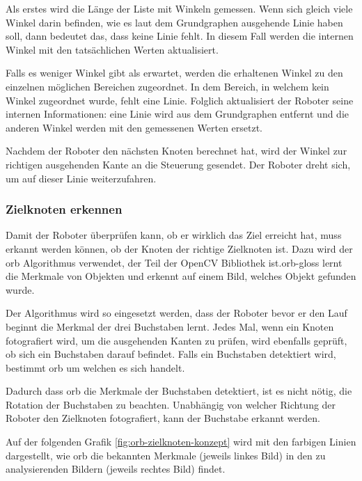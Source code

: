 Als erstes wird die Länge der Liste mit Winkeln gemessen. Wenn sich gleich viele Winkel darin befinden, wie es laut dem Grundgraphen ausgehende Linie haben soll, dann bedeutet das, dass keine Linie fehlt. In diesem Fall werden die internen Winkel mit den tatsächlichen Werten aktualisiert.

Falls es weniger Winkel gibt als erwartet, werden die erhaltenen Winkel zu den einzelnen möglichen Bereichen zugeordnet. In dem Bereich, in welchem kein Winkel zugeordnet wurde, fehlt eine Linie. Folglich aktualisiert der Roboter seine internen Informationen: eine Linie wird aus dem Grundgraphen entfernt und die anderen Winkel werden mit den gemessenen Werten ersetzt.

Nachdem der Roboter den nächsten Knoten berechnet hat, wird der Winkel zur richtigen ausgehenden Kante an die Steuerung gesendet. Der Roboter dreht sich, um auf dieser Linie weiterzufahren.

\subsubsection{Zielknoten erkennen}

Damit der Roboter überprüfen kann, ob er wirklich das Ziel erreicht hat, muss erkannt werden können, ob der Knoten der richtige Zielknoten ist. Dazu wird der \acrfull{orb} Algorithmus verwendet, der Teil der OpenCV Bibliothek ist.\gls{orb-gloss} lernt die Merkmale von Objekten und erkennt auf einem Bild, welches Objekt gefunden wurde.

Der Algorithmus wird so eingesetzt werden, dass der Roboter bevor er den Lauf beginnt die Merkmal der drei Buchstaben lernt. Jedes Mal, wenn ein Knoten fotografiert wird, um die ausgehenden Kanten zu prüfen, wird ebenfalls geprüft, ob sich ein Buchstaben darauf befindet. Falls ein Buchstaben detektiert wird, bestimmt \acrshort{orb} um welchen es sich handelt.

Dadurch dass \acrshort{orb} die Merkmale der Buchstaben detektiert, ist es nicht nötig, die Rotation der Buchstaben zu beachten. Unabhängig von welcher Richtung der Roboter den Zielknoten fotografiert, kann der Buchstabe erkannt werden.

Auf der folgenden Grafik \ref{fig:orb-zielknoten-konzept} wird mit den farbigen Linien dargestellt, wie \acrshort{orb} die bekannten Merkmale (jeweils linkes Bild) in den zu analysierenden Bildern (jeweils rechtes Bild) findet.


